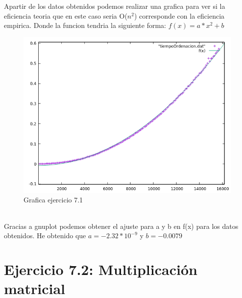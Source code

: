 \documentclass[12pt,a4psprt]{article}
\begin{document}
\pagebreak
Apartir de los datos obtenidos  podemos realizar una grafica para ver si la eficiencia teoria que en este caso seria O($n^{2}$) corresponde con la eficiencia empirica. Donde la funcion tendria la siguiente forma: \textbf{$f(x)=a*x^{2}+b $}
\begin{figure}[h]
\begin{center}
	\includegraphics[scale=1]{image/grafica_7_1.png}
\end{center}
\caption{Grafica ejercicio 7.1}

\end{figure}
\\
Gracias a gnuplot podemos obtener el ajuste para a y b en f(x) para los datos obtenidos.
He obtenido que $a=-2.32*10^{-9}$ y $b=-0.0079$
\section{Ejercicio 7.2: Multiplicación matricial}
\end{document}
